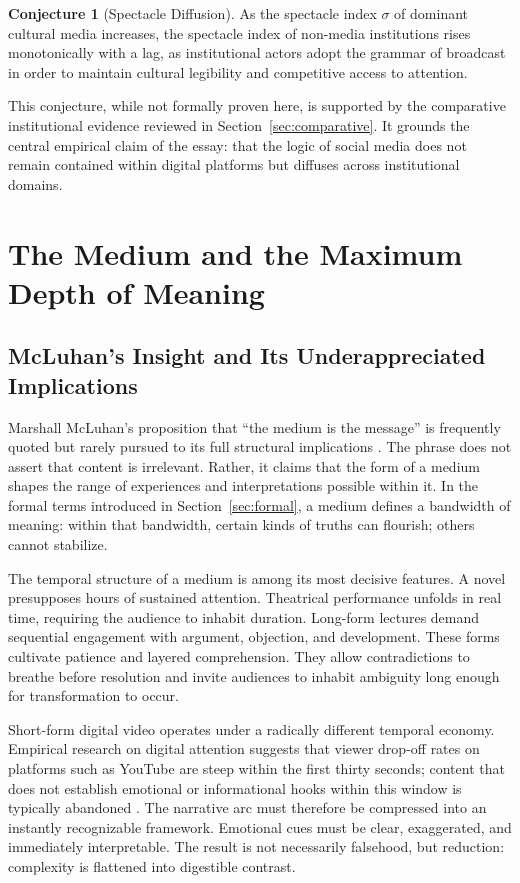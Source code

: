 \documentclass[12pt]{article}
\theoremstyle{definition}
\newtheorem{conjecture}{Conjecture}[section]
\theoremstyle{plain}
\begin{document}
\begin{conjecture}[Spectacle Diffusion]
As the spectacle index $\sigma$ of dominant cultural media increases, the spectacle index of non-media institutions rises monotonically with a lag, as institutional actors adopt the grammar of broadcast in order to maintain cultural legibility and competitive access to attention.
\end{conjecture}

This conjecture, while not formally proven here, is supported by the comparative institutional evidence reviewed in Section~\ref{sec:comparative}. It grounds the central empirical claim of the essay: that the logic of social media does not remain contained within digital platforms but diffuses across institutional domains.

\section{The Medium and the Maximum Depth of Meaning}
\label{sec:medium}

\subsection{McLuhan's Insight and Its Underappreciated Implications}

Marshall McLuhan's proposition that ``the medium is the message'' is frequently quoted but rarely pursued to its full structural implications \citep{McLuhan1994}. The phrase does not assert that content is irrelevant. Rather, it claims that the form of a medium shapes the range of experiences and interpretations possible within it. In the formal terms introduced in Section~\ref{sec:formal}, a medium defines a bandwidth of meaning: within that bandwidth, certain kinds of truths can flourish; others cannot stabilize.

The temporal structure of a medium is among its most decisive features. A novel presupposes hours of sustained attention. Theatrical performance unfolds in real time, requiring the audience to inhabit duration. Long-form lectures demand sequential engagement with argument, objection, and development. These forms cultivate patience and layered comprehension. They allow contradictions to breathe before resolution and invite audiences to inhabit ambiguity long enough for transformation to occur.

Short-form digital video operates under a radically different temporal economy. Empirical research on digital attention suggests that viewer drop-off rates on platforms such as YouTube are steep within the first thirty seconds; content that does not establish emotional or informational hooks within this window is typically abandoned \citep{Dobrowolski2019}. The narrative arc must therefore be compressed into an instantly recognizable framework. Emotional cues must be clear, exaggerated, and immediately interpretable. The result is not necessarily falsehood, but reduction: complexity is flattened into digestible contrast.
\end{document}
